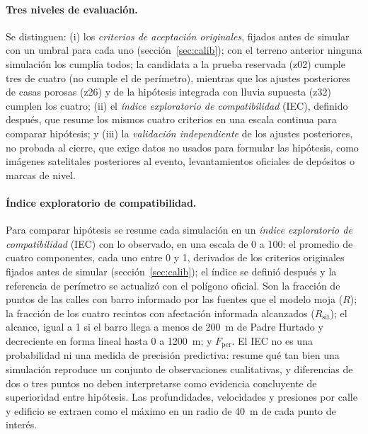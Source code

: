 \paragraph{Tres niveles de evaluación.} Se distinguen: (i) los \emph{criterios de aceptación originales}, fijados antes de simular con un umbral para cada uno (sección~\ref{sec:calib}); con el terreno anterior ninguna simulación los cumplía todos; la candidata a la prueba reservada (z02) cumple tres de cuatro (no cumple el de perímetro), mientras que los ajustes posteriores de casas porosas (z26) y de la hipótesis integrada con lluvia supuesta (z32) cumplen los cuatro; (ii) el \emph{índice exploratorio de compatibilidad} (IEC), definido después, que resume los mismos cuatro criterios en una escala continua para comparar hipótesis; y (iii) la \emph{validación independiente} de los ajustes posteriores, no probada al cierre, que exige datos no usados para formular las hipótesis, como imágenes satelitales posteriores al evento, levantamientos oficiales de depósitos o marcas de nivel.

\paragraph{Índice exploratorio de compatibilidad.} Para comparar hipótesis se resume cada simulación en un \emph{índice exploratorio de compatibilidad} (IEC) con lo observado, en una escala de 0 a 100: el promedio de cuatro componentes, cada uno entre 0 y 1, derivados de los criterios originales fijados antes de simular (sección~\ref{sec:calib}); el índice se definió después y la referencia de perímetro se actualizó con el polígono oficial. Son la fracción de puntos de las calles con barro informado por las fuentes que el modelo moja ($R$); la fracción de los cuatro recintos con afectación informada alcanzados ($R_\mathrm{sit}$); el alcance, igual a 1 si el barro llega a menos de \SI{200}{m} de Padre Hurtado y decreciente en forma lineal hasta 0 a \SI{1200}{m}; y $F_\mathrm{per}$. El IEC no es una probabilidad ni una medida de precisión predictiva: resume qué tan bien una simulación reproduce un conjunto de observaciones cualitativas, y diferencias de dos o tres puntos no deben interpretarse como evidencia concluyente de superioridad entre hipótesis. Las profundidades, velocidades y presiones por calle y edificio se extraen como el máximo en un radio de \SI{40}{m} de cada punto de interés.
